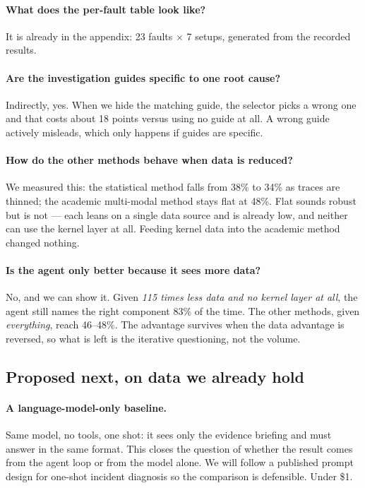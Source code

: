 \paragraph{What does the per-fault table look like?}
It is already in the appendix: 23 faults $\times$ 7 setups, generated from the
recorded results.

\paragraph{Are the investigation guides specific to one root cause?}
Indirectly, yes. When we hide the matching guide, the selector picks a wrong one and
that costs about 18 points versus using no guide at all. A wrong guide actively
misleads, which only happens if guides are specific.

\paragraph{How do the other methods behave when data is reduced?}
We measured this: the statistical method falls from 38\% to 34\% as traces are
thinned; the academic multi-modal method stays flat at 48\%. Flat sounds robust but
is not --- each leans on a single data source and is already low, and neither can use
the kernel layer at all. Feeding kernel data into the academic method changed nothing.

\paragraph{Is the agent only better because it sees more data?}
No, and we can show it. Given \emph{115 times less data and no kernel layer at all},
the agent still names the right component 83\% of the time. The other methods, given
\emph{everything}, reach 46--48\%. The advantage survives when the data advantage is
reversed, so what is left is the iterative questioning, not the volume.

\subsection{Proposed next, on data we already hold}

\paragraph{A language-model-only baseline.} Same model, no tools, one shot: it sees
only the evidence briefing and must answer in the same format. This closes the
question of whether the result comes from the agent loop or from the model alone. We
will follow a published prompt design for one-shot incident diagnosis so the
comparison is defensible. Under \$1.

